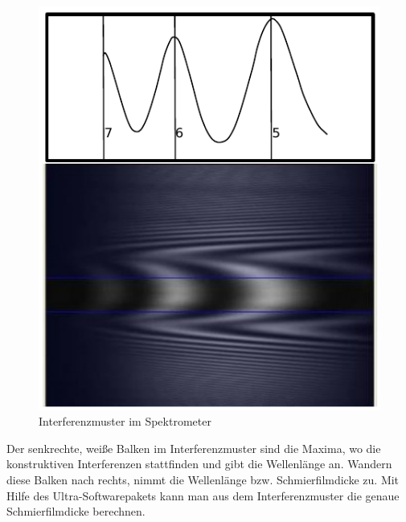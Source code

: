 \begin{figure}[htb]
    \centering
    \includegraphics[]{./images/interferenzsmuster.pdf}
    \caption{Interferenzmuster im Spektrometer~\cite{ehl_broshure}}
    \label{fig:ehl_interferenzmuster}
\end{figure}

Der senkrechte, weiße Balken im Interferenzmuster sind die Maxima, wo die konstruktiven Interferenzen stattfinden und gibt die Wellenlänge an.
Wandern diese Balken nach rechts, nimmt die Wellenlänge bzw. Schmierfilmdicke zu.
Mit Hilfe des Ultra-Softwarepakets kann man aus dem Interferenzmuster die genaue Schmierfilmdicke berechnen.


